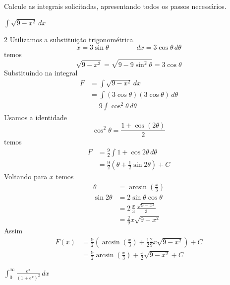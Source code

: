 \documentclass[a4paper,12pt,fleqn]{article}
\begin{document}

~\\[2mm]
Calcule as integrais solicitadas, apresentando todos os passos necessários.

\(
  \int \sqrt{9 - x^2}\, dx
\)

\begin{answer}
\begin{multicols}{2}
  Utilizamos a substituição trigonométrica
  \[
    x = 3\sin\theta
    \qquad \qquad
    dx = 3\cos\theta\, d\theta
  \]
  temos
  \[
    \sqrt{9 - x^2}
    = \sqrt{9 - 9\sin^2\theta}
    = 3\cos\theta
  \]
  Substituindo na integral
  \begin{align*}
    F
    & = \int \sqrt{9 - x^2}\, dx                        \\[2mm]
    & = \int (3\cos\theta)(3\cos\theta)\, d\theta       \\[2mm]
    & = 9 \int \cos^2\theta\, d\theta
  \end{align*}
  Usamos a identidade
  \[
    \cos^2\theta = \frac{1 + \cos(2\theta)}{2}
  \]
  temos
  \begin{align*}
    F
    & = \frac{9}{2} \int 1 + \cos 2\theta\, d\theta   \\[2mm]
    & = \frac{9}{2} \left(\theta + \frac{1}{2}\sin 2\theta \right) + C
  \end{align*}
  Voltando para $x$ temos
  \begin{align*}
    \theta
    & = \arcsin\left(\frac{x}{3}\right)
    \\
    \sin 2\theta
    & = 2\sin\theta\cos\theta                        \\[2mm]
    & = 2\,\frac{x}{3}\,\frac{\sqrt{9 - x^2}}{3}     \\[2mm]
    & = \frac{2}{9}x\sqrt{9 - x^2}
  \end{align*}
  Assim
  \begin{align*}
    F(x)
    & = \frac{9}{2}
      \left(
        \arcsin\left(\frac{x}{3}\right)
        + \frac{1}{2}\frac{2}{9}x\sqrt{9 - x^2}
      \right) + C \\[2mm]
    & = \frac{9}{2}\arcsin\left(\frac{x}{3}\right) + \frac{x}{2}\sqrt{9 - x^2} + C
  \end{align*}
\end{multicols}
\end{answer}

\(
  \int_0^{\infty} \frac{e^x}{(1 + e^x)^2} \, dx
\)
\end{document}
